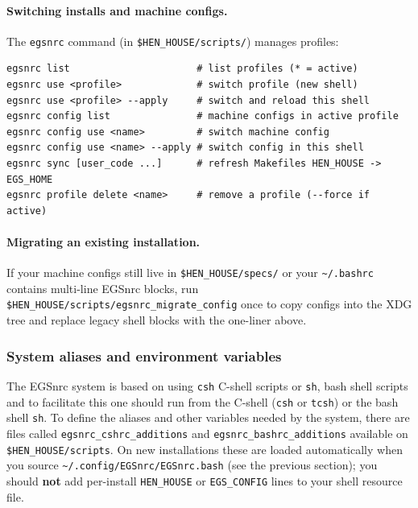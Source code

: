 \paragraph{Switching installs and machine configs.}
The \verb+egsnrc+ command (in \verb+$HEN_HOUSE/scripts/+) manages profiles:
\begin{verbatim}
egsnrc list                      # list profiles (* = active)
egsnrc use <profile>             # switch profile (new shell)
egsnrc use <profile> --apply     # switch and reload this shell
egsnrc config list               # machine configs in active profile
egsnrc config use <name>         # switch machine config
egsnrc config use <name> --apply # switch config in this shell
egsnrc sync [user_code ...]      # refresh Makefiles HEN_HOUSE -> EGS_HOME
egsnrc profile delete <name>     # remove a profile (--force if active)
\end{verbatim}

\paragraph{Migrating an existing installation.}
If your machine configs still live in \verb+$HEN_HOUSE/specs/+ or your
\verb+~/.bashrc+ contains multi-line EGSnrc blocks, run\\
\verb+$HEN_HOUSE/scripts/egsnrc_migrate_config+ once to copy configs into
the XDG tree and replace legacy shell blocks with the one-liner above.

\subsubsection{System aliases and environment variables}
 
 
The EGSnrc system is based on using {\tt csh} C-shell scripts or {\tt sh},
bash shell scripts and to
facilitate this one should run from the C-shell ({\tt csh} or {\tt tcsh})
or the bash shell {\tt sh}.
To define the
aliases and other variables needed by the system, there are files called
{\tt egsnrc\_cshrc\_additions} and {\tt egsnrc\_bashrc\_additions} available on
{\tt \$HEN\_HOUSE/scripts}.
On new installations these are loaded automatically when you source
\verb+~/.config/EGSnrc/EGSnrc.bash+ (see the previous section); you should
{\bfseries not} add per-install \verb+HEN_HOUSE+ or \verb+EGS_CONFIG+ lines
to your shell resource file.

